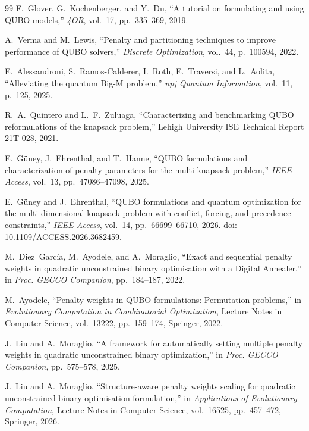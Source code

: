 \documentclass[twocolumn]{article}
\begin{document}
\begin{thebibliography}{99}
F.~Glover, G.~Kochenberger, and Y.~Du,
``A tutorial on formulating and using QUBO models,''
\emph{4OR}, vol.~17, pp.~335--369, 2019.

A.~Verma and M.~Lewis,
``Penalty and partitioning techniques to improve performance of QUBO
solvers,''
\emph{Discrete Optimization}, vol.~44, p.~100594, 2022.

E.~Alessandroni, S.~Ramos-Calderer, I.~Roth, E.~Traversi, and
L.~Aolita,
``Alleviating the quantum Big-M problem,''
\emph{npj Quantum Information}, vol.~11, p.~125, 2025.

R.~A.~Quintero and L.~F.~Zuluaga,
``Characterizing and benchmarking QUBO reformulations of the knapsack
problem,''
Lehigh University ISE Technical Report 21T-028, 2021.

E.~G\"uney, J.~Ehrenthal, and T.~Hanne,
``QUBO formulations and characterization of penalty parameters for
the multi-knapsack problem,''
\emph{IEEE Access}, vol.~13, pp.~47086--47098, 2025.

E.~G\"uney and J.~Ehrenthal,
``QUBO formulations and quantum optimization for the
multi-dimensional knapsack problem with conflict, forcing,
and precedence constraints,''
\emph{IEEE Access}, vol.~14, pp.~66699--66710, 2026.
doi: 10.1109/ACCESS.2026.3682459.

M.~Diez~Garc\'ia, M.~Ayodele, and A.~Moraglio,
``Exact and sequential penalty weights in quadratic unconstrained
binary optimisation with a Digital Annealer,''
in \emph{Proc. GECCO Companion}, pp.~184--187, 2022.

M.~Ayodele,
``Penalty weights in QUBO formulations: Permutation problems,''
in \emph{Evolutionary Computation in Combinatorial Optimization},
Lecture Notes in Computer Science, vol.~13222, pp.~159--174,
Springer, 2022.

J.~Liu and A.~Moraglio,
``A framework for automatically setting multiple penalty weights in
quadratic unconstrained binary optimization,''
in \emph{Proc. GECCO Companion}, pp.~575--578, 2025.

J.~Liu and A.~Moraglio,
``Structure-aware penalty weights scaling for quadratic unconstrained
binary optimisation formulation,''
in \emph{Applications of Evolutionary Computation}, Lecture Notes in
Computer Science, vol.~16525, pp.~457--472, Springer, 2026.


\end{thebibliography}
\end{document}
